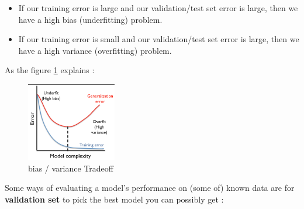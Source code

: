 \begin{itemize}
\item If our training error is large and our validation/test set error is large, then we have a high bias (underfitting) problem.
\item If our training error is small and our validation/test set error is large, then we have a high variance (overfitting) problem.
\end{itemize}
As the figure \ref{fig:bias} explains : 
\begin{figure}[H]
\centering
\includegraphics[width=0.35\textwidth]{img/model.png}
\caption{ bias / variance Tradeoff}
\label{fig:bias}
\end{figure}
Some ways of evaluating a model's performance on (some of)  known data are for \textbf{validation set } to pick  the best model you can possibly get :
